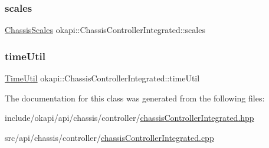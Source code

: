 \mbox{\label{classokapi_1_1ChassisControllerIntegrated_af833eeaa8569585c7f44280261c46521}} 
\subsubsection{\texorpdfstring{scales}{scales}}
{\footnotesize\ttfamily \mbox{\hyperlink{classokapi_1_1ChassisScales}{Chassis\+Scales}} okapi\+::\+Chassis\+Controller\+Integrated\+::scales\hspace{0.3cm}{\ttfamily [protected]}}

\mbox{\label{classokapi_1_1ChassisControllerIntegrated_addd982f5928a19f17105409a96eaf419}} 
\subsubsection{\texorpdfstring{timeUtil}{timeUtil}}
{\footnotesize\ttfamily \mbox{\hyperlink{classokapi_1_1TimeUtil}{Time\+Util}} okapi\+::\+Chassis\+Controller\+Integrated\+::time\+Util\hspace{0.3cm}{\ttfamily [protected]}}



The documentation for this class was generated from the following files\+:\begin{DoxyCompactItemize}
\item 
include/okapi/api/chassis/controller/\mbox{\hyperlink{chassisControllerIntegrated_8hpp}{chassis\+Controller\+Integrated.\+hpp}}\item 
src/api/chassis/controller/\mbox{\hyperlink{chassisControllerIntegrated_8cpp}{chassis\+Controller\+Integrated.\+cpp}}\end{DoxyCompactItemize}
